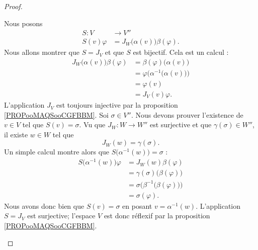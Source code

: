 \begin{proof}
\begin{subproof}
		\spitem[Le \( S\)]
		Nous posons
		\begin{equation}
			\begin{aligned}
				S\colon V   & \to V''                                  \\
				S(v)\varphi & =J_W\big( \alpha(v) \big)\beta(\varphi).
			\end{aligned}
		\end{equation}
		Nous allons montrer que \( S=J_V\) et que \( S\) est bijectif.
		\spitem[\( S=J_V\)]
		Cela est un calcul :
		\begin{subequations}
			\begin{align}
				J_W\big( \alpha(v) \big)\beta(\varphi) & =\beta(\varphi)\big( \alpha(v) \big)                 \\
				                                       & =\varphi\Big( \alpha^{-1}\big( \alpha(v) \big) \Big) \\
				                                       & =\varphi(v)                                          \\
				                                       & =J_V(v)\varphi.
			\end{align}
		\end{subequations}
		L'application \( J_V\) est toujours injective par la proposition \ref{PROPooMAQSooCGFBBM}.
		Soi \( \sigma\in V''\). Nous devons prouver l'existence de \( v\in V\) tel que \( S(v)=\sigma\). Vu que \( J_W\colon W\to W''\) est surjective et que \( \gamma(\sigma)\in W''\), il existe \( w\in W\) tel que
		\begin{equation}
			J_W(w)=\gamma(\sigma).
		\end{equation}
		Un simple calcul montre alors que \( S\big( \alpha^{-1}(w) \big)=\sigma\) :
		\begin{subequations}
			\begin{align}
				S\big( \alpha^{-1}(w) \big)\varphi & =J_W(w)\beta(\varphi)                                   \\
				                                   & =\gamma(\sigma)\big( \beta(\varphi) \big)               \\
				                                   & =\sigma\Big( \beta^{-1}\big( \beta(\varphi) \big) \Big) \\
				                                   & =\sigma(\varphi).
			\end{align}
		\end{subequations}
		Nous avons donc bien que \( S(v)=\sigma\) en posant \( v=\alpha^{-1}(w)\).
		\spitem[Conclusion]
		L'application \( S=J_V\) est surjective; l'espace \( V\) est donc réflexif par la proposition \ref{PROPooMAQSooCGFBBM}.
	\end{subproof}
\end{proof}

